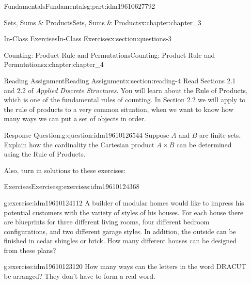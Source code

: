 \documentclass[oneside,10pt,]{book}
\numberwithin{equation}{section}
\begin{document}
\begin{partptx}{Fundamentals}{}{Fundamentals}{}{}{g:part:idm19610627792}
\begin{chapterptx}{Sets, Sums \& Products}{}{Sets, Sums \& Products}{}{}{x:chapter:chapter_3}
\begin{sectionptx}{In-Class Exercises}{}{In-Class Exercises}{}{}{x:section:questions-3}
\begin{enumerate}[label=\arabic*.]
\end{enumerate}
%
\end{sectionptx}
\end{chapterptx}
%
\typeout{************************************************}
\typeout{************************************************}
%
\begin{chapterptx}{Counting: Product Rule and Permutations}{}{Counting: Product Rule and Permutations}{}{}{x:chapter:chapter_4}
\index{}%
%
%
\typeout{************************************************}
\typeout{************************************************}
%
\begin{sectionptx}{Reading Assignment}{}{Reading Assignment}{}{}{x:section:reading-4}
Read Sections 2.1 and 2.2 of \emph{Applied Discrete Structures}.  You will learn about the Rule of Products, which is one of the fundamental rules of counting.  In Section 2.2 we will apply to the rule of products to a very common situation, when we want to know how many ways we can put a set of objects in order.%
\begin{question}{Response Question.}{g:question:idm19610126544}%
Suppose \(A\) and \(B\) are finite sets.  Explain how the cardinality the Cartesian product \(A \times B\) can be determined using the Rule of Products.%
\end{question}
Also, turn in solutions to these exercises:%
%
%
\typeout{************************************************}
\typeout{************************************************}
%
\begin{exercises-subsection-numberless}{Exercises}{}{Exercises}{}{}{g:exercises:idm19610124368}
\par\medskip\noindent%
%
\begin{exercisegroup}
\begin{divisionexerciseeg}{1}{}{}{g:exercise:idm19610124112}%
A builder of modular homes would like to impress his potential customers with the variety of styles of his houses. For each house there are blueprints for three different living rooms, four different bedroom configurations, and two different garage styles. In addition, the outside can be finished in cedar shingles or brick. How many different houses can be designed from these plans?%
\end{divisionexerciseeg}%
\begin{divisionexerciseeg}{2}{}{}{g:exercise:idm19610123120}%
How many ways can the letters in the word DRACUT be arranged? They don't have to form a real word.%

\end{divisionexerciseeg}
\end{exercisegroup}
\end{exercises-subsection-numberless}
\end{sectionptx}
\end{chapterptx}
\end{partptx}
\end{document}
